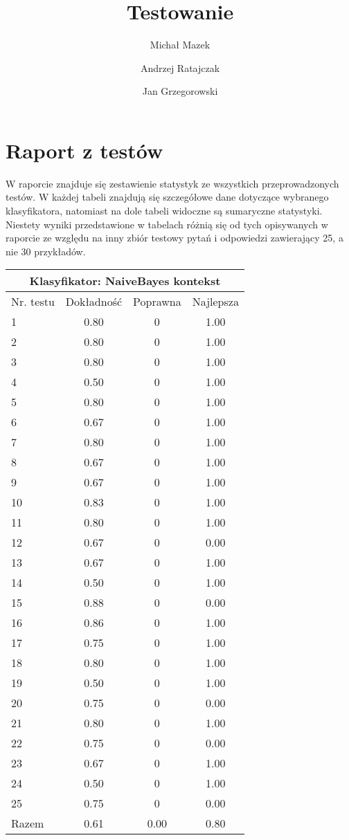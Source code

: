 \documentclass[notitlepage,leqno,fleqn,a4paper]{article}
\title{Testowanie}
\author{Michał Mazek \and Andrzej Ratajczak \and Jan Grzegorowski}
\begin{document}
\maketitle

\fontsize{13}{15}
\selectfont

\section{Raport z testów}
W raporcie znajduje się zestawienie statystyk ze wszystkich przeprowadzonych testów.
W każdej tabeli znajdują się szczegółowe dane dotyczące wybranego klasyfikatora, natomiast
na dole tabeli widoczne są sumaryczne statystyki.
Niestety wyniki przedstawione w tabelach różnią się od tych opisywanych w raporcie ze względu
na inny zbiór testowy pytań i odpowiedzi zawierający 25, a nie 30 przykładów.


\begin{tabular}{|l|c|c|c|}
\hline
\multicolumn{4}{|c|}{Klasyfikator: NaiveBayes kontekst}\\
\hline
Nr. testu & Dokładność & Poprawna & Najlepsza\\
\hline
1 & 0.80 & 0 & 1.00 \\
2 & 0.80 & 0 & 1.00 \\
3 & 0.80 & 0 & 1.00 \\
4 & 0.50 & 0 & 1.00 \\
5 & 0.80 & 0 & 1.00 \\
6 & 0.67 & 0 & 1.00 \\
7 & 0.80 & 0 & 1.00 \\
8 & 0.67 & 0 & 1.00 \\
9 & 0.67 & 0 & 1.00 \\
10 & 0.83 & 0 & 1.00 \\
11 & 0.80 & 0 & 1.00 \\
12 & 0.67 & 0 & 0.00 \\
13 & 0.67 & 0 & 1.00 \\
14 & 0.50 & 0 & 1.00 \\
15 & 0.88 & 0 & 0.00 \\
16 & 0.86 & 0 & 1.00 \\
17 & 0.75 & 0 & 1.00 \\
18 & 0.80 & 0 & 1.00 \\
19 & 0.50 & 0 & 1.00 \\
20 & 0.75 & 0 & 0.00 \\
21 & 0.80 & 0 & 1.00 \\
22 & 0.75 & 0 & 0.00 \\
23 & 0.67 & 0 & 1.00 \\
24 & 0.50 & 0 & 1.00 \\
25 & 0.75 & 0 & 0.00 \\
\hline
Razem & 0.61 & 0.00 & 0.80 \\
\hline
\end{tabular}
\end{document}

